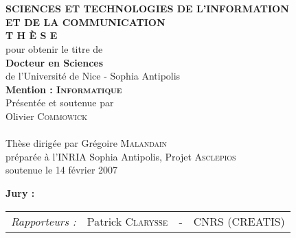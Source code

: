 

\begin{titlepage}
\begin{center}
 \\
\vspace*{0.3cm}
 \\
\noindent \textbf{SCIENCES ET TECHNOLOGIES DE L'INFORMATION \\ ET DE LA COMMUNICATION} \\
\vspace*{0.5cm}
\noindent \Huge \textbf{T H È S E} \\
\vspace*{0.3cm}
\noindent \large {pour obtenir le titre de} \\
\vspace*{0.3cm}
\noindent \LARGE \textbf{Docteur en Sciences} \\
\vspace*{0.3cm}
\noindent \Large de l'Université de Nice - Sophia Antipolis \\
\noindent \Large \textbf{Mention : \textsc{Informatique}}\\
\vspace*{0.4cm}
\noindent \large {Présentée et soutenue par\\}
\noindent \LARGE Olivier \textsc{Commowick} \\
\vspace*{0.8cm}
 \\
\vspace*{0.8cm}
\noindent \Large Thèse dirigée par Grégoire \textsc{Malandain} \\
\vspace*{0.2cm}
\noindent \Large préparée à l'INRIA Sophia Antipolis, Projet \textsc{Asclepios} \\
\vspace*{0.2cm}
\noindent \large soutenue le 14 février 2007 \\
\vspace*{0.5cm}
\end{center}
\noindent \large \textbf{Jury :} \\
\begin{center}
\noindent \large 
\begin{tabular}{llcl}
      \textit{Rapporteurs :}	& Patrick \textsc{Clarysse}		& - & CNRS (CREATIS)\\

\end{tabular}
\end{center}
\end{titlepage}
